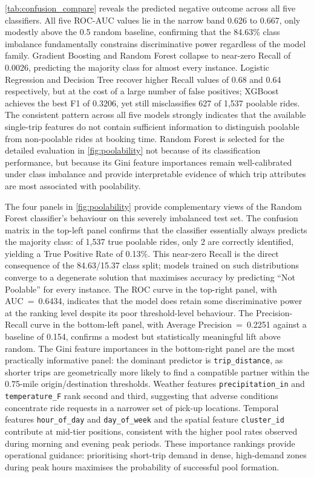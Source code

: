 \documentclass[a4paper,fleqn]{cas-dc}
\begin{document}
\autoref{tab:confusion_compare} reveals the predicted negative outcome across all five classifiers.  All five ROC-AUC values lie in the narrow band 0.626 to 0.667, only modestly above the 0.5 random baseline, confirming that the 84.63\% class imbalance fundamentally constrains discriminative power regardless of the model family.  Gradient Boosting and Random Forest collapse to near-zero Recall of 0.0026, predicting the majority class for almost every instance.  Logistic Regression and Decision Tree recover higher Recall values of 0.68 and 0.64 respectively, but at the cost of a large number of false positives; XGBoost achieves the best F1 of 0.3206, yet still misclassifies 627 of 1,537 poolable rides.  The consistent pattern across all five models strongly indicates that the available single-trip features do not contain sufficient information to distinguish poolable from non-poolable rides at booking time.  Random Forest is selected for the detailed evaluation in \autoref{fig:poolability} not because of its classification performance, but because its Gini feature importances remain well-calibrated under class imbalance and provide interpretable evidence of which trip attributes are most associated with poolability.

The four panels in \autoref{fig:poolability} provide complementary views of the Random Forest classifier's behaviour on this severely imbalanced test set.  The confusion matrix in the top-left panel confirms that the classifier essentially always predicts the majority class: of 1,537 true poolable rides, only 2 are correctly identified, yielding a True Positive Rate of 0.13\%.  This near-zero Recall is the direct consequence of the 84.63/15.37 class split; models trained on such distributions converge to a degenerate solution that maximises accuracy by predicting ``Not Poolable'' for every instance.  The ROC curve in the top-right panel, with AUC~=~0.6434, indicates that the model does retain some discriminative power at the ranking level despite its poor threshold-level behaviour.  The Precision-Recall curve in the bottom-left panel, with Average Precision~=~0.2251 against a baseline of 0.154, confirms a modest but statistically meaningful lift above random.  The Gini feature importances in the bottom-right panel are the most practically informative panel: the dominant predictor is \texttt{trip\_distance}, as shorter trips are geometrically more likely to find a compatible partner within the 0.75-mile origin/destination thresholds.  Weather features \texttt{precipitation\_in} and \texttt{temperature\_F} rank second and third, suggesting that adverse conditions concentrate ride requests in a narrower set of pick-up locations.  Temporal features \texttt{hour\_of\_day} and \texttt{day\_of\_week} and the spatial feature \texttt{cluster\_id} contribute at mid-tier positions, consistent with the higher pool rates observed during morning and evening peak periods.  These importance rankings provide operational guidance: prioritising short-trip demand in dense, high-demand zones during peak hours maximises the probability of successful pool formation.
\end{document}
